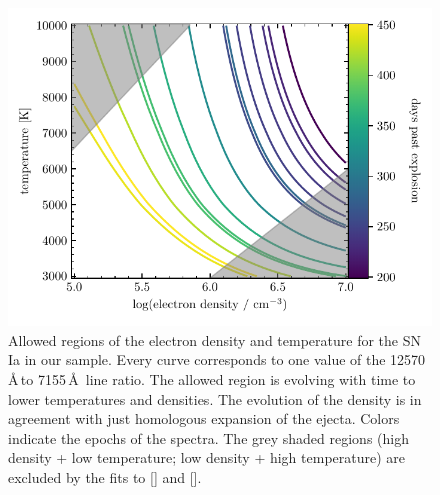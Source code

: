 \documentclass[fleqn,usenatbib]{mnras}
\begin{document}
\begin{figure}
	\includegraphics[width=\linewidth]{plots/TempDensDegeneracy.pdf}
    \caption{Allowed regions of the electron density and temperature for the SN Ia in our sample. Every curve corresponds to one value of the 12570\,\AA\,to 7155\,\AA\, line ratio. The allowed region is evolving with time to lower temperatures and densities. The evolution of the density is in agreement with just homologous expansion of the ejecta. Colors indicate the epochs of the spectra. The grey shaded regions (high density + low temperature; low density + high temperature) are excluded by the fits to [] and [].}
    \label{FigureTemperatureDensity}
\end{figure}
\end{document}
